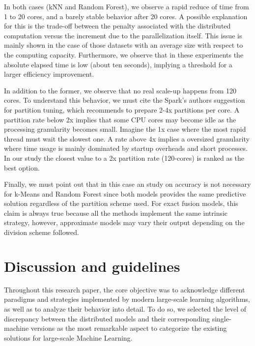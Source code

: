 \documentclass[3p,review]{elsarticle}
\begin{document}
	{In both cases (kNN and Random Forest), we observe a rapid reduce of time from 1 to 20 cores, and a barely stable behavior after 20 cores. A possible explanation for this is the trade-off between the penalty associated with the distributed computation versus the increment due to the parallelization itself. This issue is mainly shown in the case of those datasets with an average size with respect to the computing capacity. Furthermore, we observe that in these experiments the absolute elapsed time is low (about ten seconds), implying a threshold for a larger efficiency improvement.
	
	
	In addition to the former, we observe that no real scale-up happens from 120 cores. To understand this behavior, we must cite the Spark's authors suggestion~\cite{mllibguide} for partition tuning, which recommends to prepare 2-4x partitions per core. A partition rate below 2x implies that some CPU cores may become idle as the processing granularity becomes small. Imagine the 1x case where the most rapid thread must wait the slowest one. A rate above 4x implies a oversized granularity where time usage is mainly dominated by startup overheads and short processes. In our study the closest value to a 2x partition rate (120-cores) is ranked as the best option. 
	
	Finally, we must point out that in this case an study on accuracy is not necessary for k-Means and Random Forest since both models provides the same predictive solution regardless of the partition scheme used. For exact fusion models, this claim is always true because all the methods implement the same intrinsic strategy, however, approximate models may vary their output depending on the division scheme followed.  
	
	\section{Discussion and guidelines}\label{sec:discussion}
	
	Throughout this research paper, the core objective was to acknowledge different paradigms and strategies implemented by modern large-scale learning algorithms, as well as to analyze their behavior into detail. To do so, we selected the level of discrepancy between the distributed models and their corresponding single-machine versions as the most remarkable aspect to categorize the existing solutions for large-scale Machine Learning. 
	
}
\end{document}
